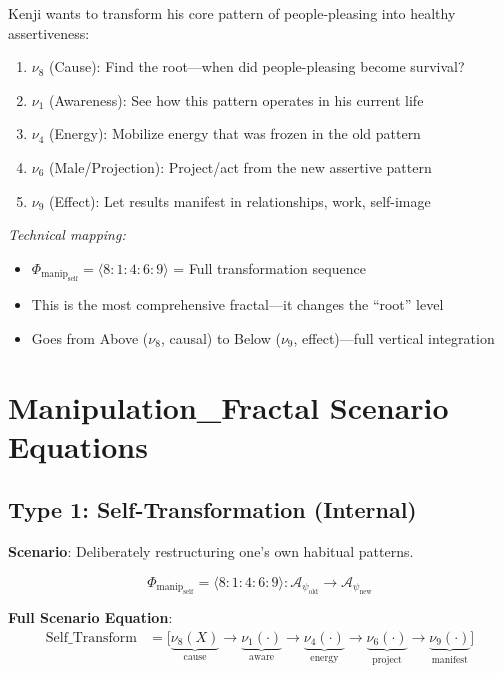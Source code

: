 \documentclass[11pt,twoside]{book}
\newcommand{\noe}[1]{\nu_{#1}}
\newcommand{\PsychAttractor}{\mathcal{A}_\psi}
\newcommand{\ManipFrac}{\Phi_{\mathrm{manip}}}
\begin{document}
\begin{tcolorbox}[colback=yellow!5!white,colframe=yellow!65!black,title=\textbf{Real-Life Scenarios: Manipulation Fractals},breakable]
Kenji wants to transform his core pattern of people-pleasing into healthy assertiveness:
\begin{enumerate}
    \item $\noe{8}$ (Cause): Find the root---when did people-pleasing become survival?
    \item $\noe{1}$ (Awareness): See how this pattern operates in his current life
    \item $\noe{4}$ (Energy): Mobilize energy that was frozen in the old pattern
    \item $\noe{6}$ (Male/Projection): Project/act from the new assertive pattern
    \item $\noe{9}$ (Effect): Let results manifest in relationships, work, self-image
\end{enumerate}

\textit{Technical mapping:}
\begin{itemize}
    \item $\ManipFrac_{\mathrm{self}} = \langle 8:1:4:6:9 \rangle$ = Full transformation sequence
    \item This is the most comprehensive fractal---it changes the ``root'' level
    \item Goes from Above ($\noe{8}$, causal) to Below ($\noe{9}$, effect)---full vertical integration
\end{itemize}

\end{tcolorbox}

\section{Manipulation\_Fractal Scenario Equations}

\subsection{Type 1: Self-Transformation (Internal)}

\textbf{Scenario}: Deliberately restructuring one's own habitual patterns.

\begin{equation}
\boxed{
    \ManipFrac_{\mathrm{self}} = \langle 8 : 1 : 4 : 6 : 9 \rangle
    : \PsychAttractor_{\mathrm{old}} \to \PsychAttractor_{\mathrm{new}}
}
\end{equation}

\textbf{Full Scenario Equation}:
\begin{align}
    \text{Self\_Transform} &= \biggl[
    \underbrace{\noe{8}(X)}_{\scriptscriptstyle\text{cause}}
    \to \underbrace{\noe{1}(\cdot)}_{\scriptscriptstyle\text{aware}}
    \to \underbrace{\noe{4}(\cdot)}_{\scriptscriptstyle\text{energy}}
    \to \underbrace{\noe{6}(\cdot)}_{\scriptscriptstyle\text{project}}
    \to \underbrace{\noe{9}(\cdot)}_{\scriptscriptstyle\text{manifest}}
    \biggr]
\end{align}
\end{document}
